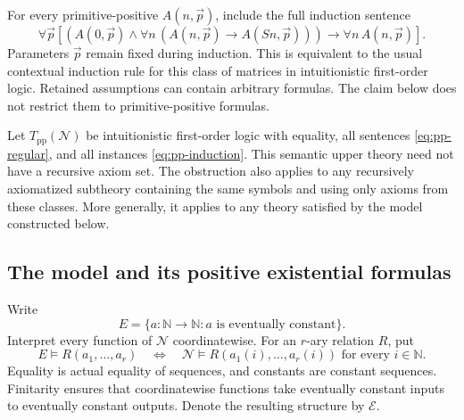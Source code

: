 \documentclass[11pt,letterpaper]{article}
\theoremstyle{definition}\newtheorem{definition}[theorem]{Definition}
\theoremstyle{remark}\newtheorem{remark}[theorem]{Remark}
\begin{document}
For every primitive-positive $A(n,\vec p)$, include the full induction
sentence
\[
 \forall\vec p\left[
 \left(A(0,\vec p)\wedge
       \forall n\,(A(n,\vec p)\to A(Sn,\vec p))\right)
 \to \forall n\,A(n,\vec p)\right].
 \tag{PPI}\label{eq:pp-induction}
\]
Parameters $\vec p$ remain fixed during induction.  This is equivalent
to the usual contextual induction rule for this class of matrices in
intuitionistic first-order logic.  Retained assumptions can contain
arbitrary formulas.  The claim below does not restrict them to
primitive-positive formulas.

Let $T_{\mathrm{pp}}(\mathcal N)$ be intuitionistic first-order logic
with equality, all sentences \eqref{eq:pp-regular}, and all instances
\eqref{eq:pp-induction}.  This semantic upper theory need not have a
recursive axiom set.  The obstruction also applies to any recursively
axiomatized subtheory containing the same symbols and using only axioms
from these classes.  More generally, it applies to any theory satisfied
by the model constructed below.

\subsection{The model and its positive existential formulas}

Write
\[
 E=\{a\colon\mathbb N\to\mathbb N:
       a\text{ is eventually constant}\}.
\]
Interpret every function of $\mathcal N$ coordinatewise.  For an
$r$-ary relation $R$, put
\[
 E\models R(a_1,\ldots,a_r)
 \quad\Longleftrightarrow\quad
 \mathcal N\models R(a_1(i),\ldots,a_r(i))
       \text{ for every }i\in\mathbb N.
\]
Equality is actual equality of sequences, and constants are constant
sequences.  Finitarity ensures that coordinatewise functions take
eventually constant inputs to eventually constant outputs.  Denote the
resulting structure by $\mathcal E$.
\end{document}
